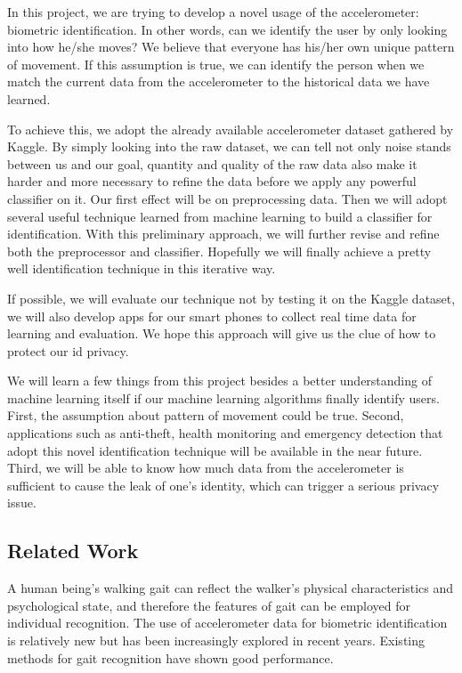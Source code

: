 \documentclass{article} %
\begin{document}
In this project, we are trying to develop a novel usage of the accelerometer: biometric identification. In other words, can we identify the user by only looking into how he/she moves? We believe that everyone has his/her own unique pattern of movement. If this assumption is true, we can identify the person when we match the current data from the accelerometer to the historical data we have learned.

To achieve this, we adopt the already available accelerometer dataset gathered by Kaggle. By simply looking into the raw dataset, we can tell not only noise stands between us and our goal, quantity and quality of the raw data also make it harder and more necessary to refine the data before we apply any powerful classifier on it. Our first effect will be on preprocessing data. Then we will adopt several useful technique learned from machine learning to build a classifier for identification. With this preliminary approach, we will further revise and refine both the preprocessor and classifier. Hopefully we will finally achieve a pretty well identification technique in this iterative way. 

If possible, we will evaluate our technique not by testing it on the Kaggle dataset, we will also develop apps for our smart phones to collect real time data for learning and evaluation. We hope this approach will give us the clue of how to protect our id privacy.

We will learn a few things from this project besides a better understanding of machine learning itself if our machine learning algorithms finally identify users. First, the assumption about pattern of movement could be true. Second, applications such as anti-theft, health monitoring and emergency detection that adopt this novel identification technique will be available in the near future. Third, we will be able to know how much data from the accelerometer is sufficient to cause the leak of one's identity, which can trigger a serious privacy issue.


\subsection{Related Work}

A human being’s walking gait can reflect the walker’s physical characteristics and psychological state, and therefore the features of gait can be employed for individual recognition. The use of accelerometer data for biometric identification is relatively new but has been increasingly explored in recent years. Existing methods for gait recognition have shown good performance.
 
\end{document}
